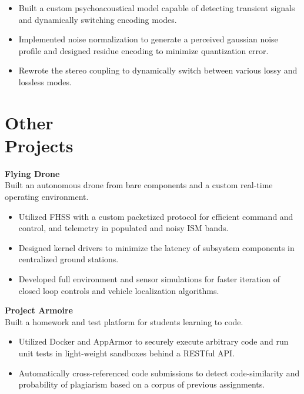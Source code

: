 \documentclass[margin,line]{resume}
\begin{document}
\begin{resume}
	\begin{itemize}
	\item Built a custom psychoacoustical model capable of detecting
              transient signals and dynamically switching encoding modes.
	\item Implemented noise normalization to generate a perceived gaussian noise
            profile and designed residue encoding to minimize
            quantization error.
	\item Rewrote the stereo coupling to dynamically switch between
	      various lossy and lossless modes.
	\end{itemize}

    \section{\mysidestyle Other\\Projects}

    \textbf{Flying Drone}\\
    Built an autonomous drone from bare components and a custom real-time operating environment.

    \begin{itemize}
      \item Utilized FHSS with a custom packetized protocol for efficient command and control,
            and telemetry in populated and noisy ISM bands.
      \item Designed kernel drivers to minimize the latency of subsystem components in centralized
            ground stations.
      \item Developed full environment and sensor simulations for faster iteration of closed loop
            controls and vehicle localization algorithms.
    \end{itemize}

    \textbf{Project Armoire}\\
    Built a homework and test platform for students learning to code.

    \begin{itemize}
        \item Utilized Docker and AppArmor to securely execute arbitrary code
              and run unit tests in light-weight sandboxes behind a RESTful API.
        \item Automatically cross-referenced code submissions to detect code-similarity
              and probability of plagiarism based on a corpus of previous assignments.
    \end{itemize}


\end{resume}
\end{document}

